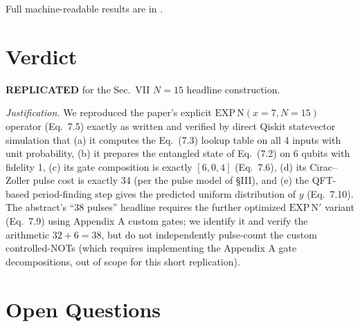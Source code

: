 \documentclass[11pt]{article}
\begin{document}
Full machine-readable results are in
.

\section{Verdict}

\textbf{REPLICATED} for the Sec.~VII $N=15$ headline construction.

\emph{Justification.} We reproduced the paper's explicit
$\mathrm{EXP\,N}(x{=}7, N{=}15)$ operator (Eq.~7.5) exactly as written and
verified by direct Qiskit statevector simulation that (a) it computes the
Eq.~(7.3) lookup table on all 4 inputs with unit probability, (b) it prepares
the entangled state of Eq.~(7.2) on 6 qubits with fidelity 1, (c) its gate
composition is exactly $[6, 0, 4]$ (Eq.~7.6), (d) its Cirac--Zoller pulse cost
is exactly 34 (per the pulse model of \S III), and (e) the QFT-based
period-finding step gives the predicted uniform distribution of $y$
(Eq.~7.10). The abstract's ``38 pulses'' headline requires the further
optimized $\mathrm{EXP\,N}'$ variant (Eq.~7.9) using Appendix A custom gates;
we identify it and verify the arithmetic $32 + 6 = 38$, but do not
independently pulse-count the custom controlled-NOTs (which requires
implementing the Appendix A gate decompositions, out of scope for this
short replication).

\section*{Open Questions}
\end{document}
